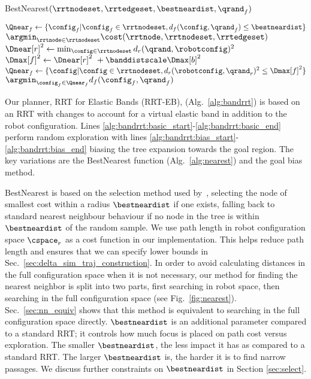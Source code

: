 \begin{algorithm}[t]
\caption{BestNearest$(\rrtnodeset, \rrtedgeset, \bestneardist, \qrand_f)$}
\begin{algorithmic}[1]
    \State $\Qnear_f \gets \{ \config_f | \config_f \in \rrtnodeset, d_f(\config, \qrand_f) \leq \bestneardist \}$
        \State \Return $\argmin_{\rrtnode \in \rrtnodeset} \cost(\rrtnode, \rrtnodeset, \rrtedgeset)$
    \Else
        \State $\Dnear[r]^2 \gets \min_{\config \in \rrtnodeset}{d_r(\qrand, \robotconfig)^2}$ \label{alg:nearst:robotspace}
        \State $\Dmax[f]^2 \gets \Dnear[r]^2\ + \banddistscale \Dmax[b]^2$
        \State $\Qnear_f \gets \{ \config | \config \in \rrtnodeset, d_r(\robotconfig, \qrand_r)^2 \leq \Dmax[f]^2 \}$ \label{alg:nearest:radius}
        \State \Return $\argmin_{\config_f \in \Qnear_f}{d_f(\config_f, \qrand_f)}$ \label{alg:nearest:fullspace}
    \EndIf
\end{algorithmic}
\label{alg:nearest}
\end{algorithm}


Our planner, RRT for Elastic Bands (RRT-EB), (Alg.~\ref{alg:bandrrt}) is based on an RRT with changes to account for a virtual elastic band in addition to the robot configuration. Lines \ref{alg:bandrrt:basic_start}-\ref{alg:bandrrt:basic_end} perform random exploration with lines \ref{alg:bandrrt:bias_start}-\ref{alg:bandrrt:bias_end} biasing the tree expansion towards the goal region. The key variations are the BestNearest function (Alg.~\ref{alg:nearest}) and the goal bias method.

BestNearest is based on the selection method used by~\cite{LiAOKP2016}, selecting the node of smallest cost within a radius $\bestneardist$ if one exists, falling back to standard nearest neighbour behaviour if no node in the tree is within $\bestneardist$ of the random sample. We use path length in robot configuration space $\cspace_r$ as a cost function in our implementation. This helps reduce path length and ensures that we can specify lower bounds in Sec.~\ref{sec:delta_sim_traj_construction}. In order to avoid calculating distances in the full configuration space when it is not necessary, our method for finding the nearest neighbor is split into two parts, first searching in robot space, then searching in the full configuration space (see Fig.~\ref{fig:nearest}). Sec.~\ref{sec:nn_equiv} shows that this method is equivalent to searching in the full configuration space directly. $\bestneardist$ is an additional parameter compared to a standard RRT; it controls how much focus is placed on path cost versus exploration. The smaller $\bestneardist$, the less impact it has as compared to a standard RRT.  The larger $\bestneardist$ is, the harder it is to find narrow passages. We discuss further constraints on $\bestneardist$ in Section \ref{sec:select}.

